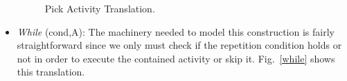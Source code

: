 \begin{itemize}
\begin{figure}[!ht]
\begin{center}
\end{center}
\caption{\label{pick} Pick Activity Translation.}
\end{figure}

\item {\it While} (cond,A): The machinery needed to model this construction is fairly straightforward since we only must check if the repetition condition holds or not in order to execute the contained activity or skip it. Fig.~\ref{while} shows this translation.
\end{itemize}
